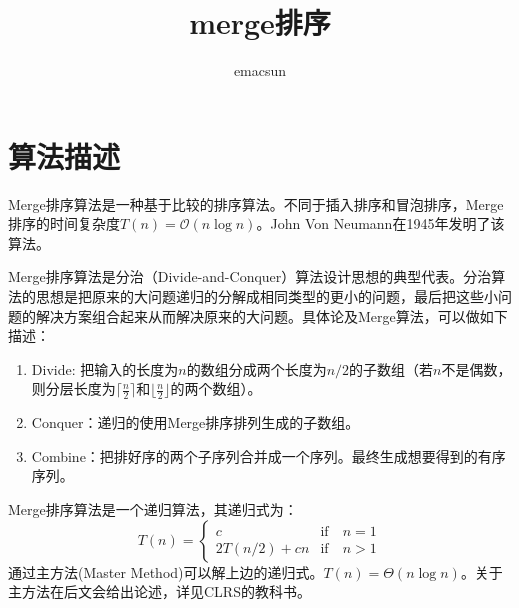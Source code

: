 \documentclass[10pt,a4paper,UTF8]{article}
\author{emacsun}
\date{}
\title{merge排序}
\begin{document}
\maketitle
\tableofcontents
{}

\section{算法描述}
\label{sec:orgca7500d}

Merge排序算法是一种基于比较的排序算法。不同于插入排序和冒泡排序，Merge排序的时间复杂度\(T(n)=\mathcal{O}(n\log{n})\)。John Von Neumann在1945年发明了该算法。

Merge排序算法是分治（Divide-and-Conquer）算法设计思想的典型代表。分治算法的思想是把原来的大问题递归的分解成相同类型的更小的问题，最后把这些小问题的解决方案组合起来从而解决原来的大问题。具体论及Merge算法，可以做如下描述：

\begin{enumerate}
\item Divide: 把输入的长度为\(n\)的数组分成两个长度为\(n/2\)的子数组（若\(n\)不是偶数，则分层长度为\(\lceil \frac{n}{2} \rceil\)和\(\lfloor \frac{n}{2} \rfloor\)的两个数组）。
\item Conquer：递归的使用Merge排序排列生成的子数组。
\item Combine：把排好序的两个子序列合并成一个序列。最终生成想要得到的有序序列。
\end{enumerate}

Merge排序算法是一个递归算法，其递归式为：
\begin{equation}
  \label{eq:20120704mergesort}
  T(n) = \left\{
  \begin{array}{ll}
    c & \text{if}\quad n=1 \\
    2T(n/2) + cn & \text{if} \quad n>1
  \end{array} \right.
\end{equation}
通过主方法(Master Method)可以解上边的递归式。\(T(n)=\Theta(n\log{n})\)。关于主方法在后文会给出论述，详见CLRS的教科书。
\end{document}
